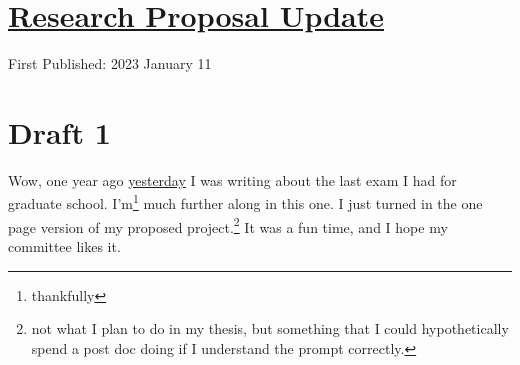 \documentclass[12pt]{article}[titlepage]
\newcommand{\1}{\={a}}
\newcommand{\2}{\={e}}
\newcommand{\3}{\={\i}}
\newcommand{\4}{\=o}
\newcommand{\5}{\=u}
\newcommand{\6}{\={A}}
\renewcommand{\,}{\textsuperscript{,}}
\begin{document}
\doublespacing
\section{\href{orp-1.html}{Research Proposal Update}}
First Published: 2023 January 11

\section{Draft 1}
Wow, one year ago \href{thesis-background-prep-1.html}{yesterday} I was writing about the last exam I had for graduate school.
I'm\footnote{thankfully} much further along in this one.
I just turned in the one page version of my proposed project.\footnote{not what I plan to do in my thesis, but something that I could hypothetically spend a post doc doing if I understand the prompt correctly.}
It was a fun time, and I hope my committee likes it.
\end{document}
